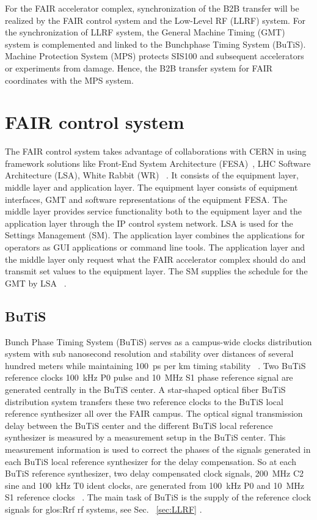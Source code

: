 
For the FAIR accelerator complex, synchronization of the B2B transfer will be realized by the FAIR control system and the Low-Level RF (LLRF) system. For the synchronization of LLRF system, the General Machine Timing (\gls{GMT}) system is complemented and linked to the Bunchphase Timing System (BuTiS). Machine Protection System (MPS) protects SIS100 and subsequent accelerators or experiments from damage. Hence, the B2B transfer system for FAIR coordinates with the MPS system. 
\section{FAIR control system}
The \gls{FAIR} control system takes advantage of collaborations with CERN in using framework solutions like Front-End System Architecture (\gls{FESA})~\cite{hoffmann_fesafront-end_2008}, LHC Software Architecture (\gls{LSA}), White Rabbit (\gls{WR}) ~\cite{huhmann_fair_2013}. It consists of the equipment layer, middle layer and application layer. The equipment layer consists of equipment interfaces, GMT and software representations of the equipment FESA. The middle layer provides service functionality both to the equipment layer and the application layer through the IP control system network. LSA is used for the Settings Management (SM). The application layer combines the applications for operators as \gls{GUI} applications or command line tools. The application layer and the middle layer only request what the FAIR accelerator complex should do and transmit set values to the equipment layer. The \gls{SM} supplies the schedule for the GMT by LSA ~\cite{huhmann_fair_2013, beck_new_2012}.

\subsection{BuTiS}
Bunch Phase Timing System (BuTiS) serves as a campus-wide clocks distribution system with sub nanosecond resolution and stability over distances of several hundred meters while maintaining \SI{100}{ps} per km timing stability ~\cite{moritz_butisdevelopment_2006}. Two BuTiS reference clocks \SI{100}{kHz} P0 pulse and \SI{10}{MHz} S1 phase reference signal are generated centrally in the BuTiS center. A star-shaped optical fiber BuTiS distribution system transfers these two reference clocks to the BuTiS local reference synthesizer all over the FAIR campus. The optical signal transmission delay between the BuTiS center and the different BuTiS local reference synthesizer is measured by a measurement setup in the BuTiS center. This measurement information is used to correct the phases of the signals generated in each BuTiS local reference synthesizer for the delay compensation. So at each BuTiS reference synthesizer, two delay compensated clock signals, \SI{200}{MHz} C2 sine and \SI{100}{kHz} T0 ident clocks, are generated from \SI{100}{kHz} P0 and \SI{10}{MHz} S1 reference clocks ~\cite{moritz_butisdevelopment_2006, zipfel_recent_2011}. The main task of BuTiS is the supply of the reference clock signals for \gls{glos:Rrf} rf systems, see Sec. ~\ref{sec:LLRF} .

